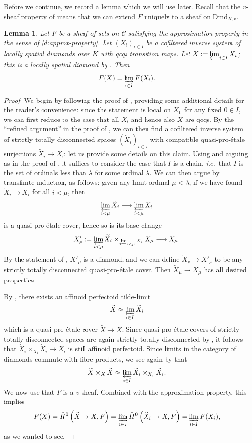 \documentclass[10pt,a4paper]{article}
\newtheorem{Lemma}[thm]{Lemma}
\theoremstyle{definition}
\theoremstyle{remark}
\newcommand{\lra}{\longrightarrow}
\newcommand{\wt}{\widetilde}
\newcommand{\cH}{{\ifmmode \check{H}\else{\v{C}ech}\fi}}
\newcommand{\Dmd}{\mathrm{Dmd}}
\numberwithin{equation}{section}
\begin{document}
Before we continue, we record a lemma which we will use later. Recall that the $v$-sheaf property of  means that we can extend $F$ uniquely to a sheaf on $\Dmd_{K,v}$.

\begin{Lemma}\label{l:approx-prop-for-fibre-products}
	Let $F$ be a sheaf of sets on $\mathcal C$ satisfying the approximation property in the sense of \cref{d:approx-property}. Let $(X_i)_{i\in I}$ be a cofiltered inverse system of locally spatial diamonds over $K$ with qcqs transition maps. Let $X:=\varprojlim_{i\in I} X_i$; this is a locally spatial diamond by \cite[Lemma~11.22]{etale-cohomology-of-diamonds}. Then
	\[ F(X)=\varinjlim_{i\in I} F(X_i).\]
\end{Lemma}

\begin{proof}
	We begin by following the proof of \cite[Lemma~11.22]{etale-cohomology-of-diamonds}, providing some additional details for the reader's convenience: since the statement is local on $X_0$ for any fixed $0\in I$, we can first reduce to the case that all $X_i$ and hence also $X$ are qcqs. By the ``refined argument'' in the proof of  \cite[Lemma~11.22]{etale-cohomology-of-diamonds}, we can then find a cofiltered inverse system of strictly totally disconnected spaces $(\wt X_i)_{i\in I}$ with compatible quasi-pro-\'etale surjections $\wt X_i\to X_i$: let us provide some details on this claim. Using \cite[Lemma~1.6]{Adamek-Rosicky} and arguing as in the proof of \cite[Corollary~1.7]{Adamek-Rosicky}, it suffices to consider the case that $I$ is a chain, \textit{i.e.}~that $I$ is the set of ordinals less than $\lambda$ for some ordinal $\lambda$. We can then argue by transfinite induction, as follows: given any limit ordinal $\mu<\lambda$, if we have found $\wt X_i\to X_i$ for all $i<\mu$, then 
	\[ \varprojlim_{i<\mu} \wt X_i\lra \varprojlim_{i<\mu} X_i\]
	is a quasi-pro-\'etale cover, hence so is its base-change
	\[ X'_\mu:=\varprojlim_{i<\mu} \wt X_i\times_{\varprojlim_{i<\mu} X_i}X_\mu \lra X_\mu.\]
	By the statement of \cite[Lemma~11.22]{etale-cohomology-of-diamonds}, $X'_\mu$ is a diamond, and we can define $\wt X_\mu\to X'_\mu$ to be any strictly totally disconnected quasi-pro-\'etale cover. Then $\wt X_\mu\to X_\mu$ has all desired properties.
	
	 By \cite[Proposition 6.5]{etale-cohomology-of-diamonds},  there exists an affinoid perfectoid tilde-limit
	\[ \wt X\approx \varprojlim_{i\in I} \wt X_i\]
	which is a quasi-pro-\'etale cover $\wt X\to X$. Since quasi-pro-\'etale covers of strictly totally disconnected spaces are again strictly totally disconnected by \cite[Lemma 7.19]{etale-cohomology-of-diamonds}, it follows that $\wt X_i\times_{X_i}\wt X_i\to X_i$ is still affinoid perfectoid. Since  limits in the category of diamonds commute with fibre products, we see  again by \cite[Proposition 6.5]{etale-cohomology-of-diamonds} that
	\[\wt X\times_X\wt X\approx \varprojlim_{i\in I} \wt X_i\times_{X_i}\wt X_i.\]
	We now use that $F$ is a $v$-sheaf. Combined with the approximation property, this implies
	\[ F(X)=\cH^0\left(\wt X\to X,F\right)=\varinjlim_{i\in I} \cH^0\left(\wt X_i\to X,F\right)=\varinjlim_{i\in I} F(X_i),\]
	as we wanted to see.
\end{proof}
\end{document}

